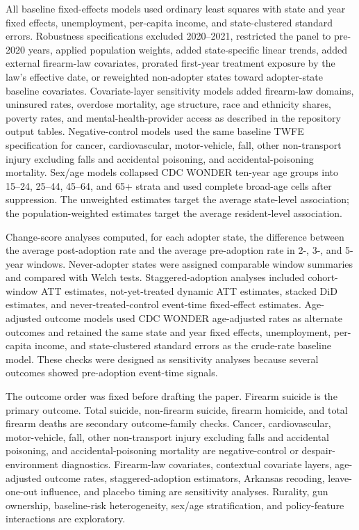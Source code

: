 \documentclass[11pt]{article}
\begin{document}
All baseline fixed-effects models used ordinary least squares with state and year fixed effects, unemployment, per-capita income, and state-clustered standard errors. Robustness specifications excluded 2020--2021, restricted the panel to pre-2020 years, applied population weights, added state-specific linear trends, added external firearm-law covariates, prorated first-year treatment exposure by the law's effective date, or reweighted non-adopter states toward adopter-state baseline covariates. Covariate-layer sensitivity models added firearm-law domains, uninsured rates, overdose mortality, age structure, race and ethnicity shares, poverty rates, and mental-health-provider access as described in the repository output tables. Negative-control models used the same baseline TWFE specification for cancer, cardiovascular, motor-vehicle, fall, other non-transport injury excluding falls and accidental poisoning, and accidental-poisoning mortality. Sex/age models collapsed CDC WONDER ten-year age groups into 15--24, 25--44, 45--64, and 65+ strata and used complete broad-age cells after suppression. The unweighted estimates target the average state-level association; the population-weighted estimates target the average resident-level association.

Change-score analyses computed, for each adopter state, the difference between the average post-adoption rate and the average pre-adoption rate in 2-, 3-, and 5-year windows. Never-adopter states were assigned comparable window summaries and compared with Welch tests. Staggered-adoption analyses included cohort-window ATT estimates, not-yet-treated dynamic ATT estimates, stacked DiD estimates, and never-treated-control event-time fixed-effect estimates. Age-adjusted outcome models used CDC WONDER age-adjusted rates as alternate outcomes and retained the same state and year fixed effects, unemployment, per-capita income, and state-clustered standard errors as the crude-rate baseline model. These checks were designed as sensitivity analyses because several outcomes showed pre-adoption event-time signals.

The outcome order was fixed before drafting the paper. Firearm suicide is the primary outcome. Total suicide, non-firearm suicide, firearm homicide, and total firearm deaths are secondary outcome-family checks. Cancer, cardiovascular, motor-vehicle, fall, other non-transport injury excluding falls and accidental poisoning, and accidental-poisoning mortality are negative-control or despair-environment diagnostics. Firearm-law covariates, contextual covariate layers, age-adjusted outcome rates, staggered-adoption estimators, Arkansas recoding, leave-one-out influence, and placebo timing are sensitivity analyses. Rurality, gun ownership, baseline-risk heterogeneity, sex/age stratification, and policy-feature interactions are exploratory.
\end{document}
